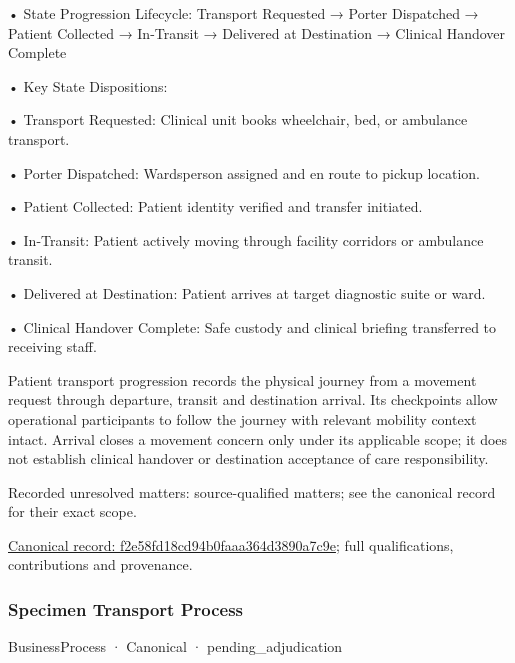•
State Progression Lifecycle: Transport Requested → Porter Dispatched → Patient Collected → In-Transit → Delivered at Destination → Clinical Handover Complete



•
Key State Dispositions:



•
Transport Requested: Clinical unit books wheelchair, bed, or ambulance transport.



•
Porter Dispatched: Wardsperson assigned and en route to pickup location.



•
Patient Collected: Patient identity verified and transfer initiated.



•
In-Transit: Patient actively moving through facility corridors or ambulance transit.



•
Delivered at Destination: Patient arrives at target diagnostic suite or ward.



•
Clinical Handover Complete: Safe custody and clinical briefing transferred to receiving staff.



Patient transport progression records the physical journey from a movement request through departure, transit and destination arrival. Its checkpoints allow operational participants to follow the journey with relevant mobility context intact. Arrival closes a movement concern only under its applicable scope; it does not establish clinical handover or destination acceptance of care responsibility.


{\small Recorded unresolved matters: source-qualified matters; see the canonical record for their exact scope.}\par
{\footnotesize \href{../../../../continuum/business/business-process/f2e58fd18cd94b0faaa364d3890a7c9e.md}{Canonical record: f2e58fd18cd94b0faaa364d3890a7c9e}; full qualifications, contributions and provenance.}\par
\subsubsection{Specimen Transport Process}

\label{element:11bb000294fc44a8af295f4682e2fe6c}
{\small BusinessProcess · Canonical · pending\_adjudication}\par

